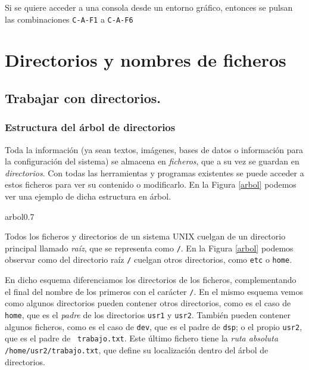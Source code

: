 Si se quiere acceder a una  consola desde un entorno gráfico, entonces
se pulsan las combinaciones {\tt C-A-F1} a {\tt C-A-F6}

\section{Directorios y nombres de ficheros}

\subsection{Trabajar con directorios.}

\subsubsection{Estructura del árbol de directorios}

Toda  la información  (ya  sean  textos, imágenes,  bases  de datos  o
información para  la configuración  del sistema)  se almacena  en {\em
ficheros}, que a su vez se guardan en {\em directorios}. Con todas las
herramientas y programas existentes se  puede acceder a estos ficheros
para ver su contenido o  modificarlo. En la Figura \ref{arbol} podemos
ver una ejemplo de dicha estructura en árbol.

\begin{figura}{arbol}{0.7}
\caption{Estructura    en   árbol    de   directorios    en   sistemas
UNIX}\label{arbol}
\end{figura}

Todos los  ficheros y  directorios de  un sistema  UNIX cuelgan  de un
directorio principal  llamado {\em raíz}, que se  representa como {\tt /}. En la  Figura \ref{arbol} podemos
observar como del  directorio raíz {\tt /}  cuelgan otros directorios,
como {\tt etc} o {\tt home}.

En  dicho  esquema  diferenciamos  los directorios  de  los  ficheros,
complementando el  final del  nombre de los  primeros con  el carácter
{\tt /}.  En el  mismo esquema vemos  como algunos  directorios pueden
contener otros directorios,  como es el caso de {\tt  home}, que es el
{\em padre} de los directorios {\tt usr1} y {\tt usr2}. También pueden
contener algunos  ficheros, como es  el caso de  {\tt dev}, que  es el
padre de {\tt  dsp}; o el propio  {\tt usr2}, que es el  padre de {\tt
trabajo.txt}. Este  último fichero tiene  la {\em ruta  absoluta} {\tt
/home/usr2/trabajo.txt}, que  define su localización dentro  del árbol
de directorios.


